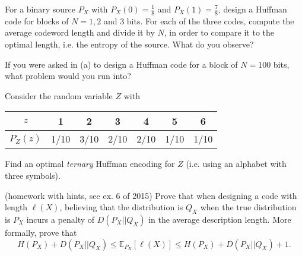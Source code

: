 \documentclass[a4paper,10pt,landscape,twocolumn]{scrartcl}
\begin{document}
\begin{exercise}
	\begin{subex}[(4pt)]
	For a binary source $P_X$ with $P_X(0) = \frac{1}{8}$ and $P_X(1) = \frac{7}{8}$, design a Huffman code for blocks of $N = 1,2$ and 3 bits. For each of the three codes, compute the average codeword length and divide it by $N$, in order to compare it to the optimal length, i.e. the entropy of the source. What do you observe?
	\end{subex}
	\begin{subex}[(1pt)]
	If you were asked in (a) to design a Huffman code for a block of $N = 100$ bits, what problem would you run into?
	\end{subex}
	\begin{subex}[(2pt)]
	Consider the random variable $Z$ with
	\begin{center}
	\begin{tabular}{c | c c c c c c}
	$z$ & 1 & 2 & 3 & 4 & 5 & 6\\
	\hline
	$P_Z(z)$ & 1/10 & 3/10 & 2/10 & 2/10 & 1/10 & 1/10\\
	\end{tabular}
	\end{center}
	Find an optimal \emph{ternary} Huffman encoding for $Z$ (i.e. using an alphabet with three symbols).
	\end{subex}
\end{exercise}



\begin{exercise}
(homework with hints, see ex. 6 of 2015)
Prove that when designing a code with length $\ell(X)$, believing that the distribution is $Q_X$ when the true distribution is $P_X$ incurs a penalty of $D(P_X||Q_X)$ in the average description length. More formally, prove that
\[
H(P_X) + D(P_X||Q_X) \leq \mathbb{E}_{P_X}[\ell(X)] \leq H(P_X) + D(P_X||Q_X) + 1.
\]
\end{exercise}
\end{document}
